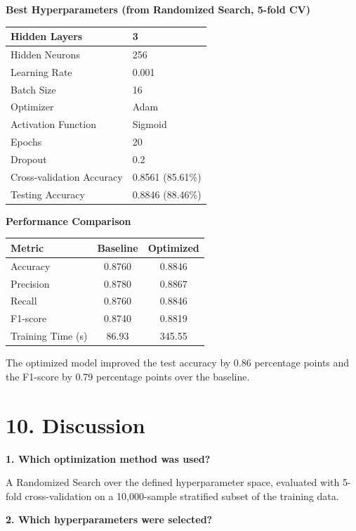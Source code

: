 \documentclass[11pt]{article}
\begin{document}
\textbf{Best Hyperparameters (from Randomized Search, 5-fold CV)}

\begin{tabular}{|p{6cm}|p{6cm}|}
\hline
Hidden Layers & 3\\\hline
Hidden Neurons & 256\\\hline
Learning Rate & 0.001\\\hline
Batch Size & 16\\\hline
Optimizer & Adam\\\hline
Activation Function & Sigmoid\\\hline
Epochs & 20\\\hline
Dropout & 0.2\\\hline
Cross-validation Accuracy & 0.8561 (85.61\%)\\\hline
Testing Accuracy & 0.8846 (88.46\%)\\\hline
\end{tabular}

\vspace{45mm}

\textbf{Performance Comparison}

\begin{tabular}{|p{4cm}|c|c|}
\hline
Metric & Baseline & Optimized\\
\hline
Accuracy & 0.8760 & 0.8846\\
Precision & 0.8780 & 0.8867\\
Recall & 0.8760 & 0.8846\\
F1-score & 0.8740 & 0.8819\\
Training Time (s) & 86.93 & 345.55\\
\hline
\end{tabular}


The optimized model improved the test accuracy by 0.86 percentage points and the F1-score by 0.79 percentage points over the baseline.


\section*{10. Discussion}

\textbf{1. Which optimization method was used?}

A Randomized Search over the defined hyperparameter space, evaluated with 5-fold cross-validation on a 10,000-sample stratified subset of the training data. 

\textbf{2. Which hyperparameters were selected?}
\end{document}

